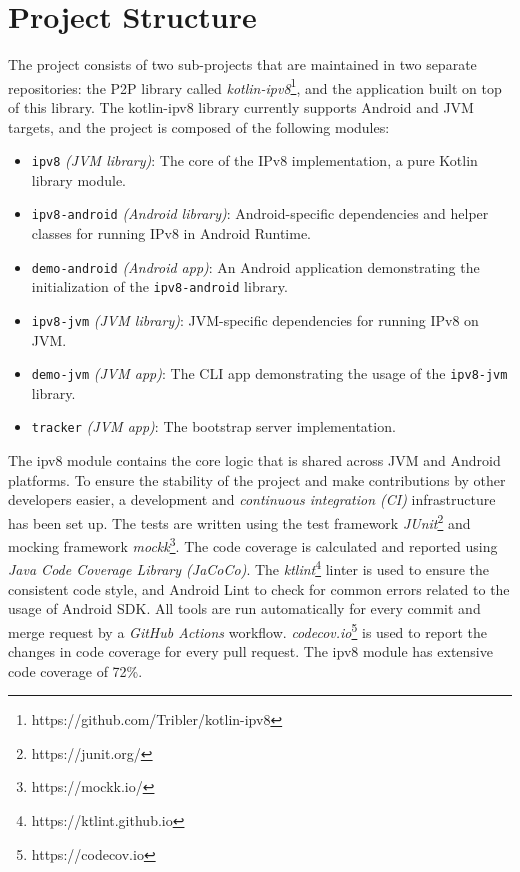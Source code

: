 \section{Project Structure}

The project consists of two sub-projects that are maintained in two separate repositories: the P2P library called \textit{kotlin-ipv8}\footnote{https://github.com/Tribler/kotlin-ipv8}, and the application built on top of this library. The kotlin-ipv8 library currently supports Android and JVM targets, and the project is composed of the following modules:

\begin{itemize}
    \item \texttt{ipv8} \textit{(JVM library)}: The core of the IPv8 implementation, a pure Kotlin library module.
    \item \texttt{ipv8-android} \textit{(Android library)}: Android-specific dependencies and helper classes for running IPv8 in Android Runtime.
    \item \texttt{demo-android} \textit{(Android app)}: An Android application demonstrating the initialization of the \texttt{ipv8-android} library.
    \item \texttt{ipv8-jvm} \textit{(JVM library)}: JVM-specific dependencies for running IPv8 on JVM.
    \item \texttt{demo-jvm} \textit{(JVM app)}: The CLI app demonstrating the usage of the \texttt{ipv8-jvm} library.
    \item \texttt{tracker} \textit{(JVM app)}: The bootstrap server implementation.
\end{itemize}

The ipv8 module contains the core logic that is shared across JVM and Android platforms. To ensure the stability of the project and make contributions by other developers easier, a development and \textit{continuous integration (CI)} infrastructure has been set up. The tests are written using the test framework \textit{JUnit}\footnote{https://junit.org/} and mocking framework \textit{mockk}\footnote{https://mockk.io/}. The code coverage is calculated and reported using \textit{Java Code Coverage Library (JaCoCo)}. The \textit{ktlint}\footnote{https://ktlint.github.io} linter is used to ensure the consistent code style, and Android Lint to check for common errors related to the usage of Android SDK. All tools are run automatically for every commit and merge request by a \textit{GitHub Actions} workflow. \textit{codecov.io}\footnote{https://codecov.io} is used to report the changes in code coverage for every pull request. The ipv8 module has extensive code coverage of 72\%.

